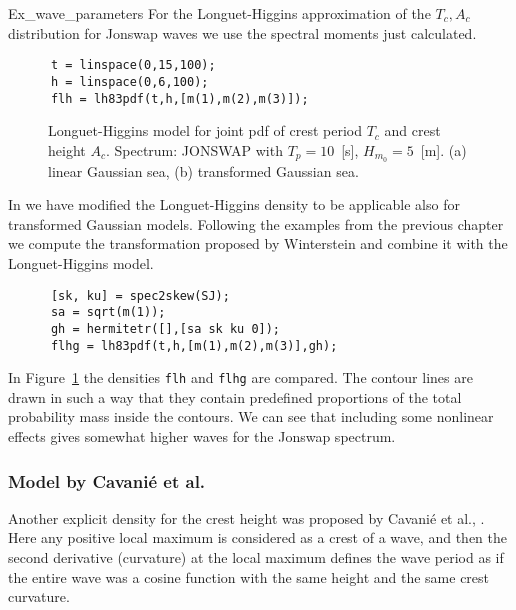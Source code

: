 \begin{cex}{Ex_wave_parameters} For the Longuet-Higgins approximation of the 
$T_c,A_c$ distribution for {\sc Jonswap} waves we use the spectral moments just calculated.
{\small\begin{verbatim}
      t = linspace(0,15,100);
      h = linspace(0,6,100);
      flh = lh83pdf(t,h,[m(1),m(2),m(3)]);
\end{verbatim}}


\begin{figure}
%
\hfill
{}
\vspace{-3mm}
  \caption[Longuet-Higgins model for joint pdf of crest period and height]{%
Longuet-Higgins model for joint pdf of crest period $T_c$
and crest height $A_c$. Spectrum: JONSWAP with $T_p=10$~[s], $H_{m_0}=5$~[m].
(a) linear Gaussian sea, (b) transformed Gaussian sea.
}
\label{fig:lhdens}
\end{figure}

In \progname{} we have modified the Longuet-Higgins
density to be applicable also for
transformed Gaussian models. Following the examples from the previous chapter
we compute the transformation proposed by Winterstein and combine it with
the Longuet-Higgins model.
{\small\begin{verbatim}
      [sk, ku] = spec2skew(SJ);
      sa = sqrt(m(1));
      gh = hermitetr([],[sa sk ku 0]);
      flhg = lh83pdf(t,h,[m(1),m(2),m(3)],gh);
\end{verbatim}} 

In Figure~\ref{fig:lhdens} the densities {\tt flh} and {\tt flhg} are
compared. The contour lines are drawn in such a way that they contain
predefined proportions of the total probability mass inside the
contours. We can see that including some nonlinear effects
gives somewhat higher waves for the {\sc Jonswap} spectrum.
\end{cex}

\subsubsection*{Model by Cavani\'e et al.} %
Another explicit density for the crest height was proposed
by Cavani{\' e} et al., \cite{CavanieEtal1976Statistical}.
Here any positive local maximum is considered
as a crest of a wave, and then the second derivative (curvature) at the
local maximum defines the wave period as if the entire wave was a cosine function
with the same height and the same crest curvature.

